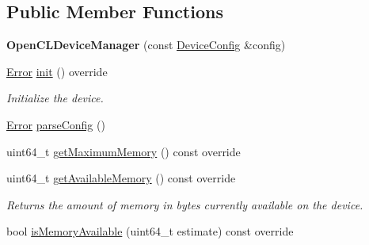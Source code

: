 \subsection*{Public Member Functions}
\begin{DoxyCompactItemize}
\item 
\mbox{\label{classglow_1_1runtime_1_1_open_c_l_device_manager_ac1f828f52c1b3777296c91a13a189a77}} 
{\bfseries Open\+C\+L\+Device\+Manager} (const \hyperlink{structglow_1_1runtime_1_1_device_config}{Device\+Config} \&config)
\item 
\hyperlink{namespaceglow_afdb176c3a672ef66db0ecfc19a8d39bf}{Error} \hyperlink{classglow_1_1runtime_1_1_open_c_l_device_manager_a2706d96882b6a599abd732449f96bdab}{init} () override
\begin{DoxyCompactList}\small\item\em Initialize the device. \end{DoxyCompactList}\item 
\hyperlink{namespaceglow_afdb176c3a672ef66db0ecfc19a8d39bf}{Error} \hyperlink{classglow_1_1runtime_1_1_open_c_l_device_manager_af95560876335be09bca28b465d895687}{parse\+Config} ()
\item 
uint64\+\_\+t \hyperlink{classglow_1_1runtime_1_1_open_c_l_device_manager_aec918b4dd4a7a0cd926844cf225db306}{get\+Maximum\+Memory} () const override
\item 
\mbox{\label{classglow_1_1runtime_1_1_open_c_l_device_manager_a8ed9fd00ebbed793fd430f9dd227a2cd}} 
uint64\+\_\+t \hyperlink{classglow_1_1runtime_1_1_open_c_l_device_manager_a8ed9fd00ebbed793fd430f9dd227a2cd}{get\+Available\+Memory} () const override
\begin{DoxyCompactList}\small\item\em Returns the amount of memory in bytes currently available on the device. \end{DoxyCompactList}\item 
bool \hyperlink{classglow_1_1runtime_1_1_open_c_l_device_manager_ab94967240f9d1ef5ae26f3a242488809}{is\+Memory\+Available} (uint64\+\_\+t estimate) const override
\end{DoxyCompactItemize}
